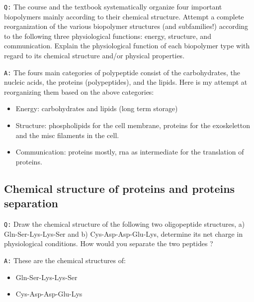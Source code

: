 \documentclass[11pt, a4paper,titlepage]{article}
\begin{document}
\texttt{Q:} The course and the textbook systematically organize four important
biopolymers mainly according to their chemical structure. Attempt a
complete reorganization of the various biopolymer structures (and
subfamilies!) according to the following three physiological
functions: energy, structure, and communication. Explain the
physiological function of each biopolymer type with regard to its
chemical structure and/or physical properties.

\texttt{A:} The fours main categories of polypeptide consist of the
carbohydrates, the nucleic acids, the proteins (polypeptides), and the
lipids. Here is my attempt at reorganizing them based on the above
categories:

\begin{itemize}
\item Energy: carbohydrates and lipids (long term storage)
\item Structure: phospholipids for the cell membrane, proteins for the
  exoskeletton and the misc filaments in the cell.
\item Communication: proteins mostly, rna as intermediate for the
  translation of proteins.
\end{itemize}
\subsection{Chemical structure of proteins and proteins separation}
\label{sec-2-2}

\texttt{Q:} Draw the chemical structure of the following two oligopeptide
structures, a) Gln-Ser-Lys-Lys-Ser and b) Cys-Asp-Asp-Glu-Lys,
determine its net charge in physiological conditions. How would you
separate the two peptides ?  

\texttt{A:} These are the chemical structures of:
\begin{itemize}
\item Gln-Ser-Lys-Lys-Ser

  \setatomsep{25pt}
\item Cys-Asp-Asp-Glu-Lys

  \setatomsep{25pt}
\end{itemize}
\end{document}
